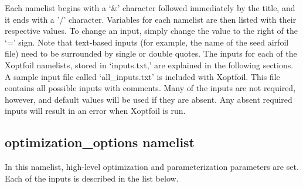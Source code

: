 \documentclass[11pt]{article}
\begin{document}
Each namelist begins with a `\&' character followed immediately by the title, and it ends with 
a '/' character.  Variables for each namelist are then listed with their respective
values.  To change an input, simply change the value to the right of the `=' sign.  Note
that text-based inputs (for example, the name of the seed airfoil file) need to be
surrounded by single or double quotes.  The inputs for each of the Xoptfoil namelists,
stored in `inputs.txt,' are explained in the following sections. A sample input file
called `all\_inputs.txt' is included with Xoptfoil. This file contains all possible
inputs with comments. Many of the inputs are not required, however, and default values
will be used if they are absent. Any absent required inputs will result in an error when
Xoptfoil is run.

\subsection{optimization\_options namelist}

In this namelist, high-level optimization and parameterization parameters are set.  Each
of the inputs is described in the list below.
\end{document}
